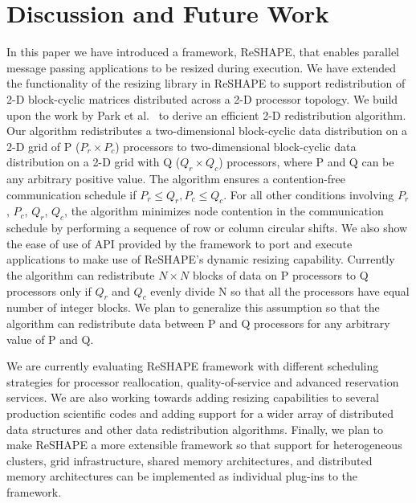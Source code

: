 \documentclass[letterpaper]{llncs}
\newcommand{\reshape}{ReSHAPE}
\begin{document}
\section{Discussion and Future Work}
\label{sec:discussion}
In this paper we have introduced a framework, ReSHAPE,  that enables parallel message passing
applications to be resized during execution. 
We have extended the functionality of the resizing library in ReSHAPE to support redistribution of 2-D block-cyclic matrices distributed across a 2-D processor topology. 
We build upon the work by Park et al.~\cite{park} to derive an efficient 2-D redistribution algorithm. Our algorithm redistributes a two-dimensional block-cyclic data
distribution on a 2-D grid of P ($P_r \times P_c$) processors to  two-dimensional block-cyclic data distribution
on a 2-D grid with Q ($Q_r \times Q_c$) processors, where P and Q can be any  arbitrary positive value. 
The algorithm  ensures a contention-free communication schedule if  $P_r \leq Q_r, P_c \leq Q_c$. 
For all other conditions involving $P_r$, $P_c$, $Q_r$, $Q_c$, the  algorithm minimizes node contention in the communication schedule by performing a sequence of row or column circular shifts.
We also show the ease of use of API provided by the framework to port and execute applications to make use of ReSHAPE's dynamic resizing capability.
Currently the algorithm can redistribute $N \times N$ blocks of data on P processors to Q processors only if $Q_r$ and $Q_c$ evenly divide N so that all the processors have equal number of integer blocks. We plan to generalize this assumption so that the algorithm can redistribute data between P and Q processors for any arbitrary value of P and Q. 

We are currently evaluating \reshape{} framework with
different scheduling strategies for processor reallocation,
quality-of-service and advanced reservation services. We are also 
working towards adding resizing capabilities to several production scientific codes and
adding support for a wider array of distributed data structures and other data
redistribution algorithms.
Finally, we plan to make \reshape{} a more extensible framework so
that support for heterogeneous clusters, grid infrastructure, shared memory
architectures, and distributed memory architectures can be implemented  as
individual plug-ins to the framework.




\end{document}
